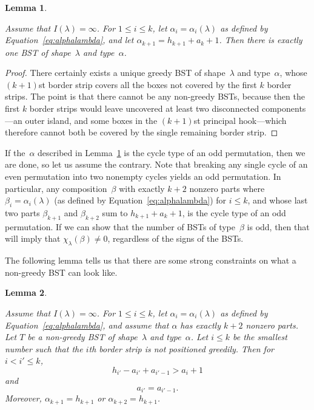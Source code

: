 \documentclass[12pt]{article}
\newtheorem{lemma}{Lemma}
\theoremstyle{definition}
\begin{document}
\begin{lemma}
\label{lem:exactlyone}

Assume that $I(\lambda)=\infty$.
For $1 \le i \le k$, let $\alpha_i = \alpha_i(\lambda)$
as defined by Equation~\eqref{eq:alphalambda},
and let $\alpha_{k+1} = h_{k+1} + a_k + 1$.
Then there is exactly one BST of shape~$\lambda$
and type~$\alpha$.
\end{lemma}

\begin{proof}

There certainly exists a unique greedy BST
of shape~$\lambda$ and type~$\alpha$,
whose $(k+1)$st border strip covers all the boxes
not covered by the first $k$ border strips.
The point is that there cannot be any non-greedy BSTs,
because then the first $k$ border strips would leave uncovered
at least two disconnected components---an
outer island, and some boxes in the $(k+1)$st
principal hook---which therefore
cannot both be covered by the single remaining border strip.
\end{proof}


If the~$\alpha$ described in Lemma~\ref{lem:exactlyone} is
the cycle type of an odd permutation, then we are done,
so let us assume the contrary.
Note that breaking any single cycle of an even permutation
into two nonempty cycles yields an odd permutation.
In particular, any composition~$\beta$ with exactly $k+2$ nonzero parts
where $\beta_i = \alpha_i(\lambda)$
(as defined by Equation~\eqref{eq:alphalambda}) for $i\le k$,
and whose last two parts $\beta_{k+1}$ and $\beta_{k+2}$
sum to $h_{k+1} + a_k + 1$,
is the cycle type of an odd permutation.
If we can show that
the number of BSTs of type~$\beta$ is odd,
then that will imply that $\chi_\lambda(\beta) \ne 0$,
regardless of the signs of the BSTs.


The following lemma tells us that there are some strong
constraints on what a non-greedy BST can look like.

\begin{lemma}
\label{lem:nongreedy2}

Assume that $I(\lambda)=\infty$.
For $1 \le i \le k$, let $\alpha_i = \alpha_i(\lambda)$
as defined by Equation~\eqref{eq:alphalambda},
and assume that $\alpha$ has exactly $k+2$ nonzero parts.
Let $T$ be a non-greedy BST of shape~$\lambda$ and type~$\alpha$.
Let $i\le k$ be the smallest number such that
the $i$th border strip is \emph{not} positioned greedily.
Then for $i < i' \le k$,
\begin{equation}
\label{eq:toolarge}
h_{i'} - a_{i'} + a_{i'-1} > a_i + 1
\end{equation}
and
\begin{equation}
\label{eq:equality}
a_{i'} = a_{i'-1}.
\end{equation}
Moreover, $\alpha_{k+1} = h_{k+1}$ or $\alpha_{k+2} = h_{k+1}$.
\end{lemma}
\end{document}
